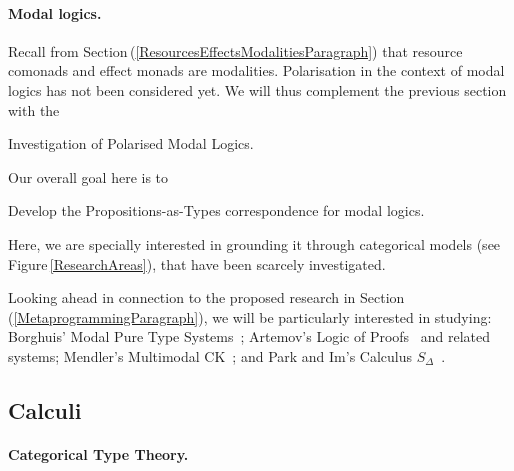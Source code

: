 \documentclass[11pt,twocolumn]{article}
\newcounter{CC}
\newenvironment{resenumerate}
  {\begin{list}{[\textbf{\arabic{CC}]}}
  {\usecounter{CC}
   \setlength{\topsep}{2pt}
   \setlength{\partopsep}{2pt}
   \setlength{\itemsep}{2.5pt}
   \setlength{\parsep}{2.5pt}
   \setlength{\leftmargin}{1.65em}
   \setlength{\labelwidth}{1.15em}
 }}
  {\end{list}}
\newcommand{\hide}[1]{}
\newcommand{\hidenote}{\hide}
\newcommand{\pref}[1]{\,(\ref{#1})}
\newcommand{\eg}{\emph{eg.}}
\begin{document}
\hidenote{polarised dialectica for program extraction motivated by
  polarised dialectica category construction}

\hidenote{Investigate relationship to Chuck Liang \& Dale Miller's work}

\hidenote{Investigate relationship to Oleg Kiselyov and Chung-chieh Shan's
  substructural type system for delimited control}

\paragraph{Modal logics.}
\label{ModalLogicsParagraph}

Recall from Section\pref{ResourcesEffectsModalitiesParagraph} that resource
comonads and effect monads are modalities.  Polarisation in the context of
modal logics has not been considered yet.  We will thus complement the
previous section with the 
\begin{resenumerate}\setcounter{CC}{0}
\item
  Investigation of Polarised Modal Logics.
\end{resenumerate}

Our overall goal here is to
\begin{resenumerate}\setcounter{CC}{1}
\item
  Develop the Propositions-as-Types correspondence for modal logics.
\end{resenumerate}
Here, we are specially interested in grounding it through categorical models
(see Figure\,\ref{ResearchAreas}), that have been scarcely investigated.

Looking ahead in connection to the proposed research in
Section\pref{MetaprogrammingParagraph}, we will be particularly interested
in studying: 
%
Borghuis' Modal Pure Type Systems~\cite{ModalPTS};
%
Artemov's Logic of Proofs~\cite{ArtemovLP} and related systems;
%
Mendler's Multimodal CK~\cite{MendlerMMCK};
and
%
Park and Im's Calculus $S_\Delta$~\cite{ParkIm}.

\subsection{Calculi}
\label{CalculiSubsection}

\hidenote{\ldots}

\setcounter{paragraph}{0}
\paragraph*{Categorical Type Theory.}
\end{document}
